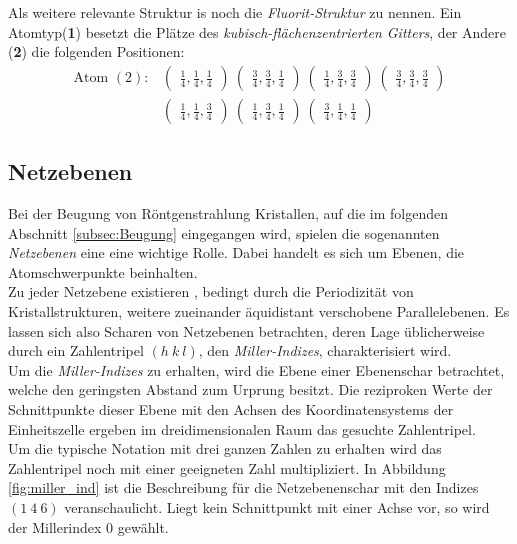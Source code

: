 Als weitere relevante Struktur is noch die
\textit{Fluorit-Struktur} zu nennen.
Ein Atomtyp(\textbf{1}) besetzt die Plätze des
\textit{kubisch-flächenzentrierten Gitters},
der Andere (\textbf{2}) die folgenden
Positionen:
\begin{align}
  \label{eqn:9*}
  \text{Atom }(2) :&
  \begin{pmatrix}
    \frac{1}{4}, \frac{1}{4}, \frac{1}{4}
  \end{pmatrix}\
  \begin{pmatrix}
    \frac{3}{4}, \frac{3}{4}, \frac{1}{4}
  \end{pmatrix}\
  \begin{pmatrix}
    \frac{1}{4}, \frac{3}{4}, \frac{3}{4}
  \end{pmatrix}\
  \begin{pmatrix}
    \frac{3}{4}, \frac{3}{4}, \frac{3}{4}
  \end{pmatrix}\\
  &\begin{pmatrix}
    \frac{1}{4}, \frac{1}{4}, \frac{3}{4}
  \end{pmatrix}\
  \begin{pmatrix}
    \frac{1}{4}, \frac{3}{4}, \frac{1}{4}
  \end{pmatrix}\
  \begin{pmatrix}
    \frac{3}{4}, \frac{1}{4}, \frac{1}{4}
  \end{pmatrix}\
\end{align}



\subsection{Netzebenen}
\label{subsec:netzebenen}
Bei der Beugung von Röntgenstrahlung Kristallen,
auf die im folgenden Abschnitt \ref{subsec:Beugung}
eingegangen wird, spielen die sogenannten \textit{Netzebenen}
eine eine wichtige Rolle. Dabei handelt es sich
um Ebenen, die Atomschwerpunkte beinhalten.\\
Zu jeder Netzebene existieren , bedingt durch die
Periodizität von Kristallstrukturen, weitere zueinander
äquidistant verschobene Parallelebenen.
Es lassen sich also Scharen von Netzebenen betrachten,
deren Lage üblicherweise durch ein Zahlentripel $(h \ k \ l)$,
den \textit{Miller-Indizes}, charakterisiert wird.\\
Um die \textit{Miller-Indizes} zu erhalten, wird die
Ebene einer Ebenenschar betrachtet, welche den geringsten
Abstand zum Urprung besitzt. Die reziproken Werte
der Schnittpunkte dieser Ebene mit den Achsen des
Koordinatensystems der Einheitszelle ergeben im
dreidimensionalen Raum das gesuchte Zahlentripel.\\
Um die typische Notation mit drei ganzen Zahlen zu erhalten
wird das Zahlentripel noch mit einer geeigneten Zahl
multipliziert. In Abbildung \ref{fig:miller_ind}
ist die Beschreibung für die Netzebenenschar mit den
Indizes $(1 \ 4 \ 6)$ veranschaulicht.
Liegt kein Schnittpunkt mit einer
Achse vor, so wird der Millerindex $0$ gewählt.

